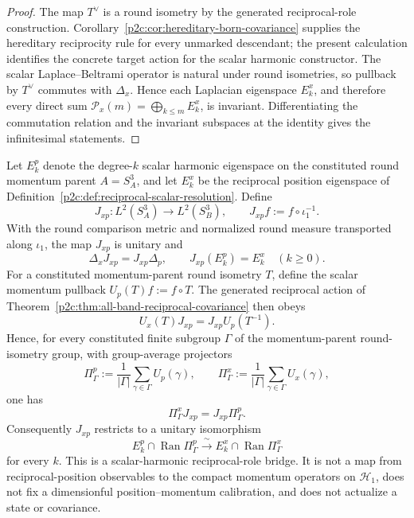 \documentclass[12pt,a4paper]{article}
\begin{document}
\begin{proof}
The map \(T^\vee\) is a round isometry by the generated reciprocal-role
construction.  Corollary~\ref{p2c:cor:hereditary-born-covariance} supplies the
hereditary reciprocity rule for every unmarked descendant; the present
calculation identifies the concrete target action for the scalar harmonic
constructor.  The scalar Laplace--Beltrami operator is natural under round
isometries, so pullback by \(T^\vee\) commutes with \(\Delta_x\).  Hence each
Laplacian eigenspace \(E_k^x\), and therefore every direct sum
\(\mathcal P_x(m)=\bigoplus_{k\le m}E_k^x\), is invariant.  Differentiating
the commutation relation and the invariant subspaces at the identity gives the
infinitesimal statements.
\end{proof}


\begin{theorem}
\label{p2c:thm:canonical-reciprocal-harmonic-intertwiner}
Let $E_k^p$ denote the degree-$k$ scalar harmonic eigenspace on the
constituted round momentum parent $A=S_A^3$, and let $E_k^x$ be the reciprocal
position eigenspace of Definition~\ref{p2c:def:reciprocal-scalar-resolution}.
Define
\[
 J_{xp}:L^2(S_A^3)\longrightarrow L^2(S_B^3),
 \qquad
 J_{xp}f:=f\circ\iota_1^{-1}.
\]
With the round comparison metric and normalized round measure transported
along $\iota_1$, the map $J_{xp}$ is unitary and
\[
 \boxed{\Delta_xJ_{xp}=J_{xp}\Delta_p},
 \qquad
 \boxed{J_{xp}(E_k^p)=E_k^x}
 \quad(k\ge0).
\]
For a constituted momentum-parent round isometry $T$, define the scalar
momentum pullback $U_p(T)f:=f\circ T$.  The generated reciprocal action of
Theorem~\ref{p2c:thm:all-band-reciprocal-covariance} then obeys
\[
 U_x(T)J_{xp}=J_{xp}U_p(T^{-1}).
\]
Hence, for every constituted finite subgroup $\Gamma$ of the momentum-parent
round-isometry group, with group-average projectors
\[
 \Pi_\Gamma^p:=\frac1{|\Gamma|}\sum_{\gamma\in\Gamma}U_p(\gamma),
 \qquad
 \Pi_\Gamma^x:=\frac1{|\Gamma|}\sum_{\gamma\in\Gamma}U_x(\gamma),
\]
one has
\[
 \boxed{\Pi_\Gamma^xJ_{xp}=J_{xp}\Pi_\Gamma^p}.
\]
Consequently $J_{xp}$ restricts to a unitary isomorphism
\[
 E_k^p\cap\operatorname{Ran}\Pi_\Gamma^p
 \xrightarrow{\ \sim\ }
 E_k^x\cap\operatorname{Ran}\Pi_\Gamma^x
\]
for every $k$.  This is a scalar-harmonic reciprocal-role bridge.  It is not
a map from reciprocal-position observables to the compact momentum operators
on $\mathcal H_1$, does not fix a dimensionful position--momentum
calibration, and does not actualize a state or covariance.
\end{theorem}
\end{document}
